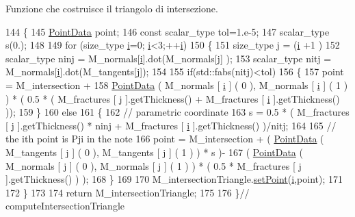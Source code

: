 Funzione che costruisce il triangolo di intersezione. 


\begin{DoxyCode}
144 \{
145     \hyperlink{classPointData}{PointData} point;
146     \textcolor{keyword}{const} scalar\_type tol=1.e-5;
147     scalar\_type s(0.);
148     
149     \textcolor{keywordflow}{for} (size\_type \hyperlink{matrici_8m_a6f6ccfcf58b31cb6412107d9d5281426}{i}=0; \hyperlink{matrici_8m_a6f6ccfcf58b31cb6412107d9d5281426}{i}<3;++\hyperlink{matrici_8m_a6f6ccfcf58b31cb6412107d9d5281426}{i})
150     \{
151         size\_type j = (\hyperlink{matrici_8m_a6f6ccfcf58b31cb6412107d9d5281426}{i} +1 ) %
152         scalar\_type ninj = M\_normals[\hyperlink{matrici_8m_a6f6ccfcf58b31cb6412107d9d5281426}{i}].dot(M\_normals[j] );
153         scalar\_type nitj = M\_normals[\hyperlink{matrici_8m_a6f6ccfcf58b31cb6412107d9d5281426}{i}].dot(M\_tangents[j]);
154         
155         \textcolor{keywordflow}{if}(std::fabs(nitj)<tol)
156         \{
157             point = M\_intersection + 
158                     \hyperlink{classPointData}{PointData} ( M\_normals [ \hyperlink{matrici_8m_a6f6ccfcf58b31cb6412107d9d5281426}{i} ] ( 0 ), M\_normals [ \hyperlink{matrici_8m_a6f6ccfcf58b31cb6412107d9d5281426}{i} ] ( 1 ) ) * ( 0.5 * ( 
      M\_fractures [ j ].getThickness() + M\_fractures [ \hyperlink{matrici_8m_a6f6ccfcf58b31cb6412107d9d5281426}{i} ].getThickness() ));
159         \}
160         \textcolor{keywordflow}{else}
161         \{
162             \textcolor{comment}{// parametric coordinate}
163             s    = 0.5 * ( M\_fractures [ j ].getThickness() * ninj + M\_fractures [ 
      \hyperlink{matrici_8m_a6f6ccfcf58b31cb6412107d9d5281426}{i} ].getThickness() )/nitj;
164         
165             \textcolor{comment}{// the ith point is Pji in the note}
166             point = M\_intersection + ( \hyperlink{classPointData}{PointData} ( M\_tangents [ j ] ( 0 ), M\_tangents [ j ] ( 1 ) 
      ) * s )- 
167                                     ( \hyperlink{classPointData}{PointData} ( M\_normals [ j ] ( 0 ), M\_normals [ j ] ( 1 ) ) *
       ( 0.5 * M\_fractures [ j ].getThickness() ) );
168         \}
169     
170         M\_intersectionTriangle.\hyperlink{classTriangleData_a24c79732610361d5e11ee7ac2d577467}{setPoint}(\hyperlink{matrici_8m_a6f6ccfcf58b31cb6412107d9d5281426}{i},point);
171         
172     \}
173     
174     \textcolor{keywordflow}{return} M\_intersectionTriangle;
175 
176 \}\textcolor{comment}{// computeIntersectionTriangle}
\end{DoxyCode}


